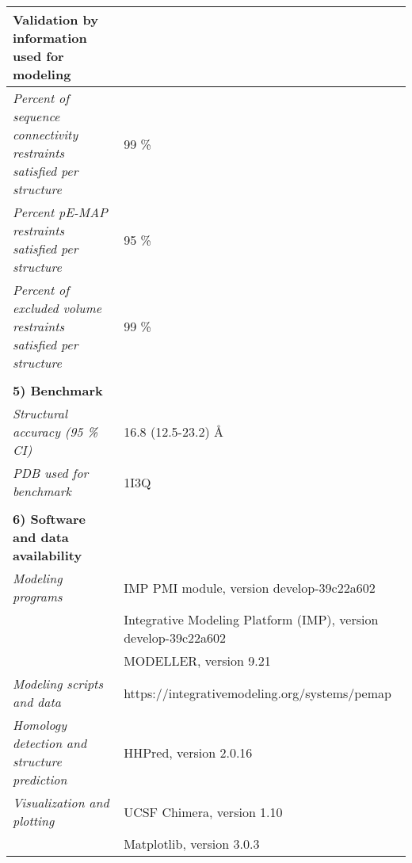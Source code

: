 \documentclass[8pt,a4paper]{article}
\begin{document}
\begin{longtable}{ p{} | p{} }
  \textbf{Validation by information used for modeling} & \\
  \hline
          \textit{Percent of sequence connectivity restraints satisfied per structure} & 99 \%\\
                \textit{Percent pE-MAP restraints satisfied per structure} & 95 \%\\
                \textit{Percent of excluded volume restraints satisfied per structure} & 99 \%\\
          &  \\
  
  \textbf{5) Benchmark} & \\
  \hline
          \textit{Structural accuracy (95 \% CI)} & 16.8 (12.5-23.2) \AA\\
                \textit{PDB used for benchmark} & 1I3Q\\
          
   &  \\
  \normalsize{\textbf{6) Software and data availability}} & \\
    \hline
             \textit{Modeling programs} & IMP PMI module, version develop-39c22a602\\
             & Integrative Modeling Platform (IMP), version develop-39c22a602 \\
             & MODELLER, version 9.21 \\
                  \textit{Modeling scripts and data} & https://integrativemodeling.org/systems/pemap\\
                  \textit{Homology detection and structure prediction} & HHPred, version 2.0.16\\
                  \textit{Visualization and plotting} & UCSF Chimera, version 1.10\\
             & Matplotlib, version 3.0.3  \\
          \hline

  
\end{longtable}
\end{document}
